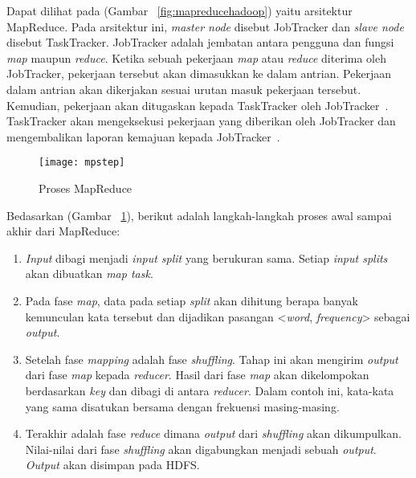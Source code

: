 Dapat dilihat pada (Gambar ~\ref{fig:mapreducehadoop}) yaitu arsitektur MapReduce. Pada arsitektur ini, {\it master node} disebut JobTracker dan {\it slave node} disebut TaskTracker. JobTracker adalah jembatan antara pengguna dan fungsi \textit{map} maupun \textit{reduce}. Ketika sebuah pekerjaan \textit{map} atau \textit{reduce} diterima oleh JobTracker, pekerjaan tersebut akan dimasukkan ke dalam antrian. Pekerjaan dalam antrian akan dikerjakan sesuai urutan masuk pekerjaan tersebut. Kemudian, pekerjaan akan ditugaskan kepada TaskTracker oleh JobTracker~\cite{tomwhite:05:htdg}. TaskTracker akan mengeksekusi pekerjaan yang diberikan oleh JobTracker dan mengembalikan laporan kemajuan kepada JobTracker~\cite{tomwhite:05:htdg}.   


\begin{figure}[H]
    \centering  
    \texttt{[image: mpstep]}  
    \caption[Proses MapReduce]{Proses MapReduce} 
    \label{fig:mpstep} 
\end{figure}

Bedasarkan (Gambar ~\ref{fig:mpstep}), berikut adalah langkah-langkah proses awal  sampai akhir dari MapReduce:

\begin{enumerate}
\item \textit{Input} dibagi menjadi {\it input split} yang berukuran sama. Setiap \textit{input splits} akan dibuatkan \textit{map task}.

\item Pada fase \textit{map}, data pada setiap \textit{split} akan dihitung berapa banyak kemunculan kata tersebut dan dijadikan pasangan <\textit{word}, \textit{frequency}> sebagai \textit{output}.

\item Setelah fase \textit{mapping} adalah fase \textit{shuffling}. Tahap ini akan mengirim \textit{output} dari fase \textit{map} kepada \textit{reducer}. Hasil dari fase \textit{map} akan dikelompokan berdasarkan \textit{key} dan dibagi di antara \textit{reducer}. Dalam contoh ini, kata-kata yang sama disatukan bersama dengan frekuensi masing-masing.


\item Terakhir adalah fase \textit{reduce} dimana \textit{output} dari \textit{shuffling} akan dikumpulkan. Nilai-nilai dari fase \textit{shuffling} akan digabungkan menjadi sebuah \textit{output}. \textit{Output} akan disimpan pada HDFS.

\end{enumerate}

